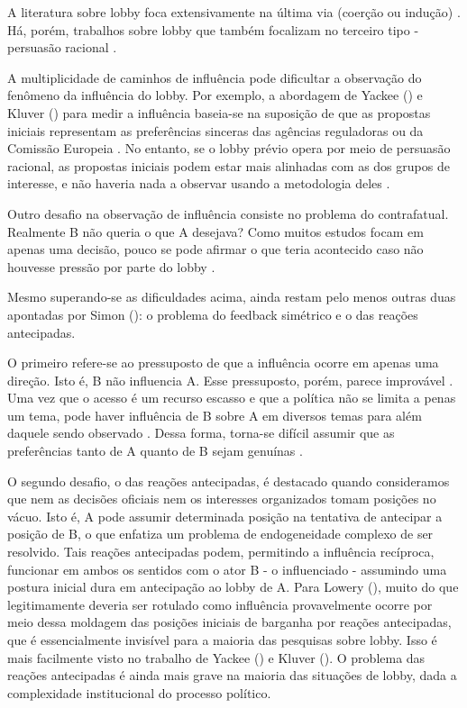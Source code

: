 A literatura sobre lobby foca extensivamente na última via (coerção ou indução) \cite{lowery_lobbying_2013}. Há, porém, trabalhos sobre lobby que também focalizam no terceiro tipo - persuasão racional \cite{bauer1963, milbrath1963, burnstein2002, kersh2002}. 

A multiplicidade de caminhos de influência pode dificultar a observação do fenômeno da influência do lobby. Por exemplo, a abordagem de Yackee (\citeyear{yackee2006sweet}) e Kluver (\citeyear{kluver2015legislative}) para medir a influência baseia-se na suposição de que as propostas iniciais representam as preferências sinceras das agências reguladoras \cite{yackee2006sweet} ou da Comissão Europeia \cite{kluver2015legislative}. No entanto, se o lobby prévio opera por meio de persuasão racional, as propostas iniciais podem estar mais alinhadas com as dos grupos de interesse, e não haveria nada a observar usando a metodologia deles \cite{lowery_lobbying_2013}.

Outro desafio na observação de influência consiste no problema do contrafatual. Realmente B não queria o que A desejava? Como muitos estudos focam em apenas uma decisão, pouco se pode afirmar o que teria acontecido caso não houvesse pressão por parte do lobby \cite{lowery_lobbying_2013}.
    
Mesmo superando-se as dificuldades acima, ainda restam pelo menos outras duas apontadas por Simon (\citeyear{simon_notes_1953}): o problema do feedback simétrico e o das reações antecipadas.

    O primeiro refere-se ao pressuposto de que a influência ocorre em apenas uma direção. Isto é, B não influencia A. Esse pressuposto, porém, parece improvável \cite{lowery_lobbying_2013}. Uma vez que o acesso é um recurso escasso \cite{hall1990buying, chin2000foot} e que a política não se limita a penas um tema, pode haver influência de B sobre A em diversos temas para além daquele sendo observado \cite{peterson1992presidency}. Dessa forma, torna-se difícil assumir que as preferências tanto de A quanto de B sejam genuínas \cite{lowery_lobbying_2013}.

    O segundo desafio, o das reações antecipadas, é destacado quando consideramos que nem as decisões oficiais nem os interesses organizados tomam posições no vácuo. Isto é, A pode assumir determinada posição na tentativa de antecipar a posição de B, o que enfatiza um problema de endogeneidade complexo de ser resolvido. Tais reações antecipadas podem, permitindo a influência recíproca, funcionar em ambos os sentidos com o ator B - o influenciado - assumindo uma postura inicial dura em antecipação ao lobby de A. Para Lowery (\citeyear{lowery_lobbying_2013}), muito do que legitimamente deveria ser rotulado como influência provavelmente ocorre por meio dessa moldagem das posições iniciais de barganha por reações antecipadas, que é essencialmente invisível para a maioria das pesquisas sobre lobby. Isso é mais facilmente visto no trabalho de Yackee (\citeyear{yackee2006sweet}) e Kluver (\citeyear{kluver2015legislative}). O problema das reações antecipadas é ainda mais grave na maioria das situações de lobby, dada a complexidade institucional do processo político.

